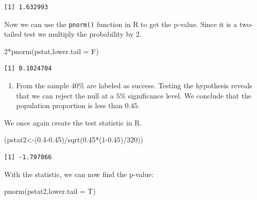 \documentclass[
  letterpaper,
  DIV=11,
  numbers=noendperiod]{scrreprt}
\newenvironment{Shaded}{\begin{snugshade}}{\end{snugshade}}
\newcommand{\AttributeTok}[1]{\textcolor[rgb]{0.40,0.45,0.13}{#1}}
\newcommand{\DecValTok}[1]{\textcolor[rgb]{0.68,0.00,0.00}{#1}}
\newcommand{\FloatTok}[1]{\textcolor[rgb]{0.68,0.00,0.00}{#1}}
\newcommand{\FunctionTok}[1]{\textcolor[rgb]{0.28,0.35,0.67}{#1}}
\newcommand{\NormalTok}[1]{\textcolor[rgb]{0.00,0.23,0.31}{#1}}
\newcommand{\OtherTok}[1]{\textcolor[rgb]{0.00,0.23,0.31}{#1}}
\newcommand{\SpecialCharTok}[1]{\textcolor[rgb]{0.37,0.37,0.37}{#1}}
\providecommand{\tightlist}{%
  \setlength{\itemsep}{0pt}\setlength{\parskip}{0pt}}\usepackage{longtable,booktabs,array}
\begin{document}
\begin{verbatim}
[1] 1.632993
\end{verbatim}

Now we can use the \texttt{pnorm()} function in R to get the p-value.
Since it is a two-tailed test we multiply the probability by 2.

\begin{Shaded}
\begin{Highlighting}[numbers=left,,]
\DecValTok{2}\SpecialCharTok{*}\FunctionTok{pnorm}\NormalTok{(pstat,}\AttributeTok{lower.tail =}\NormalTok{ F)}
\end{Highlighting}
\end{Shaded}

\begin{verbatim}
[1] 0.1024704
\end{verbatim}

\begin{enumerate}
\def\labelenumi{\arabic{enumi}.}
\setcounter{enumi}{1}
\tightlist
\item
  From the sample \(40\)\% are labeled as success. Testing the
  hypothesis reveals that we can reject the null at a \(5\)\%
  significance level. We conclude that the population proportion is less
  than \(0.45\).
\end{enumerate}

We once again create the test statistic in R.

\begin{Shaded}
\begin{Highlighting}[numbers=left,,]
\NormalTok{(pstat2}\OtherTok{\textless{}{-}}\NormalTok{(}\FloatTok{0.4{-}0.45}\NormalTok{)}\SpecialCharTok{/}\FunctionTok{sqrt}\NormalTok{(}\FloatTok{0.45}\SpecialCharTok{*}\NormalTok{(}\DecValTok{1}\FloatTok{{-}0.45}\NormalTok{)}\SpecialCharTok{/}\DecValTok{320}\NormalTok{))}
\end{Highlighting}
\end{Shaded}

\begin{verbatim}
[1] -1.797866
\end{verbatim}

With the statistic, we can now find the p-value:

\begin{Shaded}
\begin{Highlighting}[numbers=left,,]
\FunctionTok{pnorm}\NormalTok{(pstat2,}\AttributeTok{lower.tail =}\NormalTok{ T)}
\end{Highlighting}
\end{Shaded}
\end{document}
